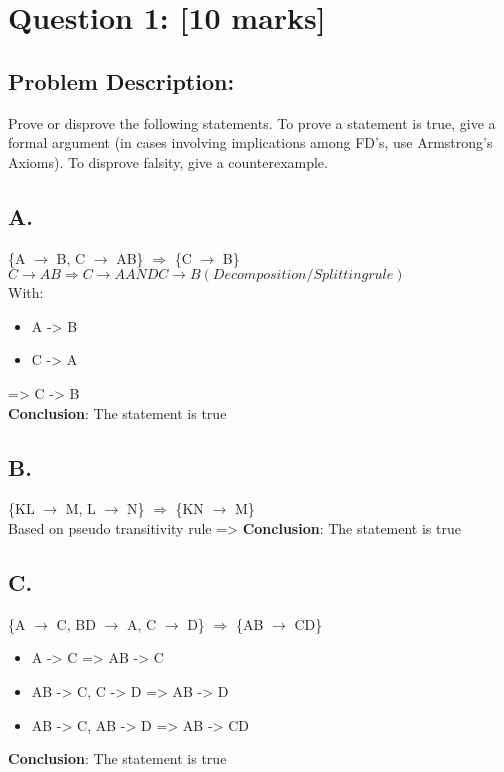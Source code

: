 \newpage
\section{Question 1: [10 marks]}
\subsection{Problem Description:}

Prove or disprove the following statements. To prove a statement is true, give a formal
argument (in cases involving implications among FD’s, use Armstrong’s Axioms). To
disprove falsity, give a counterexample.

\subsection{A.}
\{A $\rightarrow$ B, C $\rightarrow$ AB\} $\Rightarrow$ \{C $\rightarrow$ B\}
\\

$C \rightarrow AB \Rightarrow C \rightarrow A AND C \rightarrow B (Decomposition/Splitting rule) $\\
With:
\begin{itemize}
    \item A -> B
    \item C -> A
\end{itemize}
=> C -> B
\\
\textbf{Conclusion}: The statement is true

\subsection{B.}
\{KL $\rightarrow$ M, L $\rightarrow$ N\} $\Rightarrow$ \{KN $\rightarrow$ M\} \\
Based on pseudo transitivity rule => 
\textbf{Conclusion}: The statement is true

\subsection{C.}
\{A $\rightarrow$ C, BD $\rightarrow$ A, C $\rightarrow$ D\} $\Rightarrow$ \{AB $\rightarrow$ CD\} \\
\begin{itemize}
    \item {A -> C} => AB -> C
    \item {AB -> C, C -> D} => AB -> D
    \item {AB -> C, AB -> D} => AB -> CD
\end{itemize}
\textbf{Conclusion}: The statement is true
